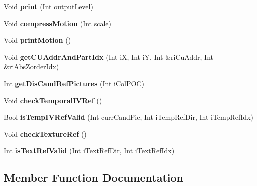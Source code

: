 \begin{DoxyCompactItemize}
\item 
\mbox{\label{class_t_com_pic_afd26e17d56b951f0765438b34f185f4f}} 
Void {\bfseries print} (Int output\+Level)
\item 
\mbox{\label{class_t_com_pic_af4f856350281e747a8ae85eb3b065c9c}} 
Void {\bfseries compress\+Motion} (Int scale)
\item 
\mbox{\label{class_t_com_pic_a19565e94aace9b405026df2523de636b}} 
Void {\bfseries print\+Motion} ()
\item 
\mbox{\label{class_t_com_pic_aeb6665238c75c2d287d57901871585d1}} 
Void {\bfseries get\+C\+U\+Addr\+And\+Part\+Idx} (Int iX, Int iY, Int \&ri\+Cu\+Addr, Int \&ri\+Abs\+Zorder\+Idx)
\item 
\mbox{\label{class_t_com_pic_ae5909550412a0973cbbd036cb98ef017}} 
Int {\bfseries get\+Dis\+Cand\+Ref\+Pictures} (Int i\+Col\+P\+OC)
\item 
\mbox{\label{class_t_com_pic_a8af4cf58c8ae8a86f41665c79231ca0e}} 
Void {\bfseries check\+Temporal\+I\+V\+Ref} ()
\item 
\mbox{\label{class_t_com_pic_a443509df3774fb241e7a1773a71122c2}} 
Bool {\bfseries is\+Temp\+I\+V\+Ref\+Valid} (Int curr\+Cand\+Pic, Int i\+Temp\+Ref\+Dir, Int i\+Temp\+Ref\+Idx)
\item 
\mbox{\label{class_t_com_pic_ab812aca39b8244b07f2dee6e4480caf9}} 
Void {\bfseries check\+Texture\+Ref} ()
\item 
\mbox{\label{class_t_com_pic_a0c514a62be082601db086c7e9cbcba04}} 
Int {\bfseries is\+Text\+Ref\+Valid} (Int i\+Text\+Ref\+Dir, Int i\+Text\+Ref\+Idx)
\end{DoxyCompactItemize}



\subsection{Member Function Documentation}
\mbox{\label{class_t_com_pic_ab7bea16171c30ecdfedf0a191b28cafc}} 
